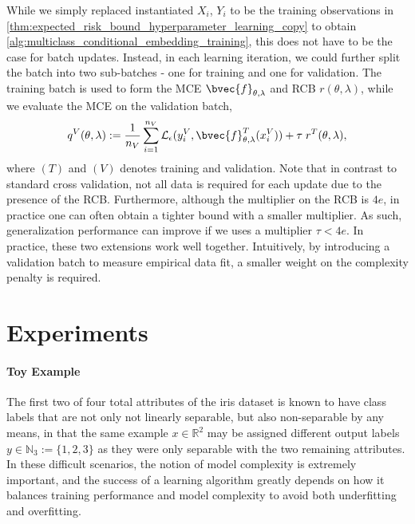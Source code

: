 \documentclass[twoside]{article}
\begin{document}
		While we simply replaced instantiated $X_{i}$, $Y_{i}$ to be the training observations in \cref{thm:expected_risk_bound_hyperparameter_learning_copy} to obtain \cref{alg:multiclass_conditional_embedding_training}, this does not have to be the case for batch updates. Instead, in each learning iteration, we could further split the batch into two sub-batches - one for training and one for validation. The training batch is used to form the \gls{MCE} $\bvec{f}_{\theta, \lambda}$ and \gls{RCB} $r(\theta, \lambda)$, while we evaluate the \gls{MCE} on the validation batch,
		\begin{equation}
		q^{V}(\theta, \lambda) := \frac{1}{n_{V}} \sum_{i = 1}^{n_{V}} \mathcal{L}_{\epsilon}(y^{V}_{i}, \bvec{f}^{T}_{\theta, \lambda}(x^{V}_{i})) + \tau \; r^{T}(\theta, \lambda),
		\label{eq:validation_learning_objective}
		\end{equation}
		where $(T)$ and $(V)$ denotes training and validation. Note that in contrast to standard cross validation, not all data is required for each update due to the presence of the \gls{RCB}. Furthermore, although the multiplier on the \gls{RCB} is $4 e$, in practice one can often obtain a tighter bound with a smaller multiplier. As such, generalization performance can improve if we uses a multiplier $\tau < 4 e$. In practice, these two extensions work well together. Intuitively, by introducing a validation batch to measure empirical data fit, a smaller weight on the complexity penalty is required. 
		

		
	\section{Experiments}
	\label{sec:experiments}
	
	\paragraph{Toy Example}
		
		The first two of four total attributes of the iris dataset \citep{fisher1936use} is known to have class labels that are not only not linearly separable, but also non-separable by any means, in that the same example $x \in \mathbb{R}^{2}$ may be assigned different output labels $y \in \mathbb{N}_{3} := \{1, 2, 3\}$ as they were only separable with the two remaining attributes. In these difficult scenarios, the notion of model complexity is extremely important, and the success of a learning algorithm greatly depends on how it balances training performance and model complexity to avoid both underfitting and overfitting. 
		
\end{document}
